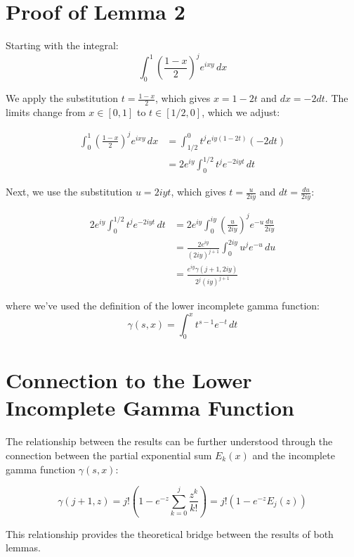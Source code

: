\documentclass{article}
\begin{document}
\section{Proof of Lemma 2}

Starting with the integral:
\begin{equation}
\int_0^1 \left(\frac{1-x}{2}\right)^j e^{ixy} \, dx
\end{equation}

We apply the substitution $t = \frac{1-x}{2}$, which gives $x = 1-2t$ and $dx = -2dt$. The limits change from $x \in [0,1]$ to $t \in [1/2,0]$, which we adjust:

\begin{align}
\int_0^1 \left(\frac{1-x}{2}\right)^j e^{ixy} \, dx &= \int_{1/2}^0 t^j e^{iy(1-2t)} (-2dt)\\
&= 2e^{iy}\int_0^{1/2} t^j e^{-2iyt} \, dt
\end{align}

Next, we use the substitution $u = 2iyt$, which gives $t = \frac{u}{2iy}$ and $dt = \frac{du}{2iy}$:

\begin{align}
2e^{iy}\int_0^{1/2} t^j e^{-2iyt} \, dt &= 2e^{iy}\int_0^{iy} \left(\frac{u}{2iy}\right)^j e^{-u} \frac{du}{2iy}\\
&= \frac{2e^{iy}}{(2iy)^{j+1}}\int_0^{2iy} u^j e^{-u} \, du\\
&= \frac{e^{iy}\gamma(j+1,2iy)}{2^j(iy)^{j+1}}
\end{align}

where we've used the definition of the lower incomplete gamma function:
\begin{equation}
\gamma(s,x) = \int_0^x t^{s-1}e^{-t} \, dt
\end{equation}

\section{Connection to the Lower Incomplete Gamma Function}

The relationship between the results can be further understood through the connection between the partial exponential sum $E_k(x)$ and the incomplete gamma function $\gamma(s,x)$:

\begin{equation}
\gamma(j+1,z) = j!\left(1 - e^{-z}\sum_{k=0}^j \frac{z^k}{k!}\right) = j!\left(1 - e^{-z}E_j(z)\right)
\end{equation}

This relationship provides the theoretical bridge between the results of both lemmas.
\end{document}
